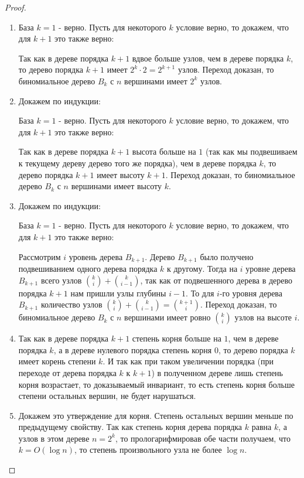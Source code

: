 \documentclass[discrete.tex]{subfiles}
\begin{document}
  \begin{proof}
    \begin{enumerate}
      \item База $k = 1$ - верно. Пусть для некоторого $k $ условие верно, то докажем, что для $k + 1$ это также верно:

      Так как в дереве порядка $k+1$ вдвое больше узлов, чем в дереве порядка $k$, то дерево порядка $k+1$ имеет $2^k \cdot 2 = 2^{k+1}$ узлов. Переход доказан, то биномиальное дерево $B_k$ с $n$ вершинами имеет $2^k$ узлов.
      \item Докажем по индукции:

      База $k = 1$ - верно. Пусть для некоторого $k $ условие верно, то докажем, что для $k + 1$ это также верно:

      Так как в дереве порядка $k+1$ высота больше на $1$ (так как мы подвешиваем к текущему дереву дерево того же порядка), чем в дереве порядка $k$, то дерево порядка $k+1$ имеет высоту $k + 1$. Переход доказан, то биномиальное дерево $B_k$ с $n$ вершинами имеет высоту $k$.
      \item Докажем по индукции:

      База $k = 1$ - верно. Пусть для некоторого $k $ условие верно, то докажем, что для $k + 1$ это также верно:

      Рассмотрим $i$ уровень дерева $B_{k+1}$. Дерево $B_{k+1}$ было получено подвешиванием одного дерева порядка $k$ к другому. Тогда на $i$ уровне дерева $B_{k+1}$ всего узлов ${k\choose i} + {k\choose {i - 1}}$, так как от подвешенного дерева в дерево порядка $k+1$ нам пришли узлы глубины $i-1$. То для $i$-го уровня дерева $B_{k+1}$ количество узлов ${k\choose i} + {k\choose {i - 1}} = {{k + 1}\choose i}$. Переход доказан, то биномиальное дерево $B_k$ с $n$ вершинами имеет ровно $k\choose i$ узлов на высоте $i$.
      \item Так как в дереве порядка $k+1$ степень корня больше на $1$, чем в дереве порядка $k$, а в дереве нулевого порядка степень корня $0$, то дерево порядка $k$ имеет корень степени $k$. И так как при таком увеличении порядка (при переходе от дерева порядка $k$  к $k+1$) в полученном дереве лишь степень корня возрастает, то доказываемый инвариант, то есть степень корня больше степени остальных вершин, не будет нарушаться.
      \item Докажем это утверждение для корня. Степень остальных вершин меньше по предыдущему свойству. Так как степень корня дерева порядка $k$ равна $k$, а узлов в этом дереве $n = 2^k$, то прологарифмировав обе части получаем, что $k=O(\log n)$, то степень произвольного узла не более $\log n$.
    \end{enumerate}
  \end{proof}
\end{document}
